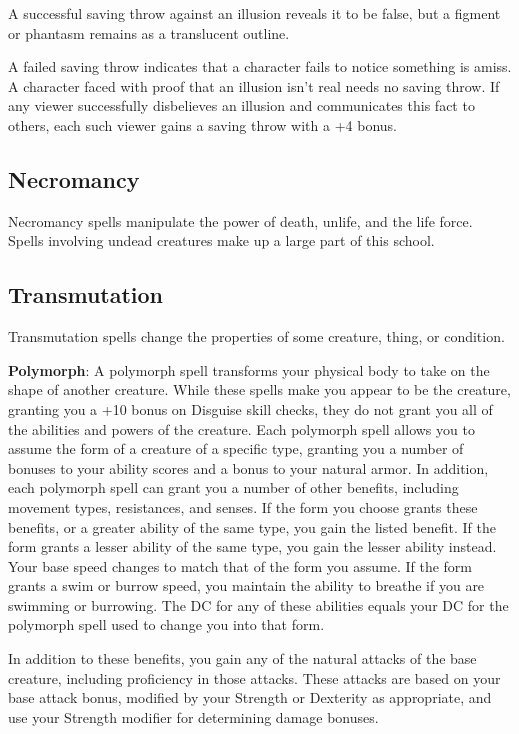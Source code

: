 A successful saving throw against an illusion reveals it to be false, but a figment or phantasm remains as a translucent outline.
				
A failed saving throw indicates that a character fails to notice something is amiss. A character faced with proof that an illusion isn't real needs no saving throw. If any viewer successfully disbelieves an illusion and communicates this fact to others, each such viewer gains a saving throw with a +4 bonus.
				
\subsection{Necromancy}

				
Necromancy spells manipulate the power of death, unlife, and the life force. Spells involving undead creatures make up a large part of this school. 
				
\subsection{Transmutation}

				
Transmutation spells change the properties of some creature, thing, or condition. 
				
\textbf{Polymorph}: A polymorph spell transforms your physical body to take on the shape of another creature. While these spells make you appear to be the creature, granting you a +10 bonus on Disguise skill checks, they do not grant you all of the abilities and powers of the creature. Each polymorph spell allows you to assume the form of a creature of a specific type, granting you a number of bonuses to your ability scores and a bonus to your natural armor. In addition, each polymorph spell can grant you a number of other benefits, including movement types, resistances, and senses. If the form you choose grants these benefits, or a greater ability of the same type, you gain the listed benefit. If the form grants a lesser ability of the same type, you gain the lesser ability instead. Your base speed changes to match that of the form you assume. If the form grants a swim or burrow speed, you maintain the ability to breathe if you are swimming or burrowing. The DC for any of these abilities equals your DC for the polymorph spell used to change you into that form. 
				
In addition to these benefits, you gain any of the natural attacks of the base creature, including proficiency in those attacks. These attacks are based on your base attack bonus, modified by your Strength or Dexterity as appropriate, and use your Strength modifier for determining damage bonuses.
				
